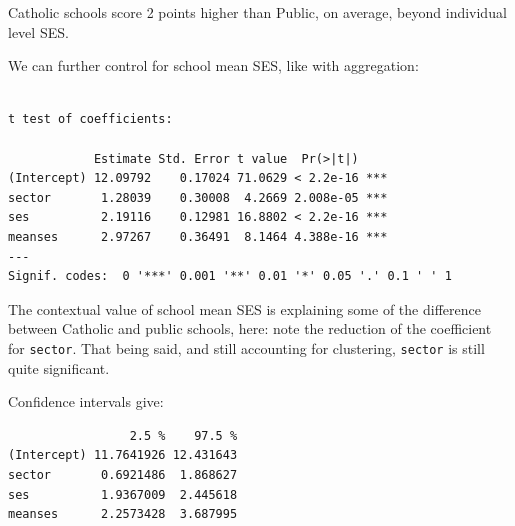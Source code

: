 \documentclass[
  letterpaper,
  DIV=11,
  numbers=noendperiod]{scrreprt}
\newenvironment{Shaded}{\begin{snugshade}}{\end{snugshade}}
\newcommand{\AttributeTok}[1]{\textcolor[rgb]{0.49,0.56,0.16}{#1}}
\newcommand{\DecValTok}[1]{\textcolor[rgb]{0.25,0.63,0.44}{#1}}
\newcommand{\FunctionTok}[1]{\textcolor[rgb]{0.02,0.16,0.49}{#1}}
\newcommand{\NormalTok}[1]{\textcolor[rgb]{0.00,0.44,0.13}{#1}}
\newcommand{\OtherTok}[1]{\textcolor[rgb]{0.00,0.44,0.13}{#1}}
\newcommand{\SpecialCharTok}[1]{\textcolor[rgb]{0.25,0.44,0.63}{#1}}
\begin{document}
Catholic schools score 2 points higher than Public, on average, beyond
individual level SES.

We can further control for school mean SES, like with aggregation:

\begin{Shaded}
\end{Shaded}

\begin{verbatim}

t test of coefficients:

            Estimate Std. Error t value  Pr(>|t|)    
(Intercept) 12.09792    0.17024 71.0629 < 2.2e-16 ***
sector       1.28039    0.30008  4.2669 2.008e-05 ***
ses          2.19116    0.12981 16.8802 < 2.2e-16 ***
meanses      2.97267    0.36491  8.1464 4.388e-16 ***
---
Signif. codes:  0 '***' 0.001 '**' 0.01 '*' 0.05 '.' 0.1 ' ' 1
\end{verbatim}

The contextual value of school mean SES is explaining some of the
difference between Catholic and public schools, here: note the reduction
of the coefficient for \texttt{sector}. That being said, and still
accounting for clustering, \texttt{sector} is still quite significant.

Confidence intervals give:

\begin{Shaded}
\end{Shaded}

\begin{verbatim}
                 2.5 %    97.5 %
(Intercept) 11.7641926 12.431643
sector       0.6921486  1.868627
ses          1.9367009  2.445618
meanses      2.2573428  3.687995
\end{verbatim}
\end{document}
